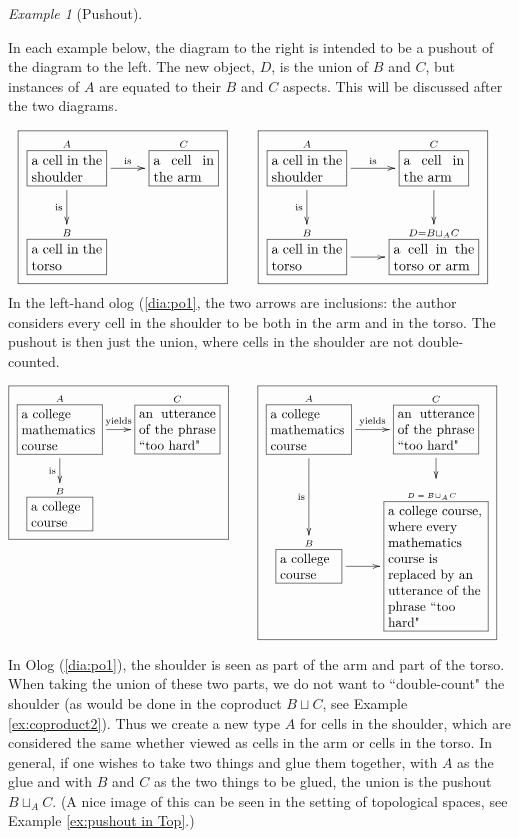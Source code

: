 \documentclass{book}
\def\tn{\textnormal}
\def\hsp{\hspace{.3in}}
\def\rr{\raggedright}
\newcommand{\LA}[2]{\ar[#1]^-{\tn {#2}}}
\newcommand{\LAL}[2]{\ar[#1]_-{\tn {#2}}}
\newcommand{\obox}[3]{\stackrel{#1}{\fbox{\parbox{#2}{#3}}}}
\theoremstyle{remark}
\newtheorem{example}[subsubsection]{Example}
\theoremstyle{definition}
\begin{document}
\begin{example}[Pushout]\label{ex:pushout}

In each example below, the diagram to the right is intended to be a pushout of the diagram to the left.  The new object, $D$, is the union of $B$ and $C$, but instances of $A$ are equated to their $B$ and $C$ aspects.  This will be discussed after the two diagrams.

\begin{align}
\label{dia:po1}\fbox{\xymatrixnocompile{\obox{A}{.7in}{a cell in the shoulder}\LA{r}{is}\LAL{d}{is}&\obox{C}{.6in}{a cell in the arm}\\\obox{B}{.7in}{a cell in the torso}}}\hsp&\fbox{\xymatrix{\obox{A}{.7in}{a cell in the shoulder}\LA{r}{is}\LAL{d}{is}&\obox{C}{.6in}{a cell in the arm}\LA{d}{}\\\obox{B}{.7in}{a cell in the torso}\LA{r}{}&\obox{D=B\sqcup_AC}{.8in}{a cell in the torso or arm}}}
\end{align}
In the left-hand olog (\ref{dia:po1}, the two arrows are inclusions: the author considers every cell in the shoulder to be both in the arm and in the torso. The pushout is then just the union, where cells in the shoulder are not double-counted.

\begin{align}\label{dia:po2}\fbox{\xymatrixnocompile@=18pt{\obox{A}{.8in}{\rr a college mathematics course}\LA{r}{yields}\LAL{d}{is}&\obox{C}{.8in}{an utterance of the phrase ``too hard"}\\\obox{B}{.6in}{\rr a college course}}}\hsp&\fbox{\xymatrixnocompile@=18pt{\obox{A}{.8in}{\rr a college mathematics course}\LA{r}{yields}\LAL{d}{is}&\obox{C}{.8in}{an utterance of the phrase ``too hard"}\LA{d}{}\\\obox{B}{.6in}{\rr a college course}\LA{r}{}&\obox{\parbox{.6in}{\vspace{.1in}\tiny$D=B\!\sqcup_A\!C$}}{1in}{\rr a college course, where every mathematics course is replaced by an utterance of the phrase ``too hard"}}}
\end{align}

In Olog (\ref{dia:po1}), the shoulder is seen as part of the arm and part of the torso.  When taking the union of these two parts, we do not want to ``double-count" the shoulder (as would be done in the coproduct $B\sqcup C$, see Example \ref{ex:coproduct2}).  Thus we create a new type $A$ for cells in the shoulder, which are considered the same whether viewed as cells in the arm or cells in the torso.  In general, if one wishes to take two things and glue them together, with $A$ as the glue and with $B$ and $C$ as the two things to be glued, the union is the pushout $B\sqcup_AC$. (A nice image of this can be seen in the setting of topological spaces, see Example \ref{ex:pushout in Top}.)


\end{example}
\end{document}
